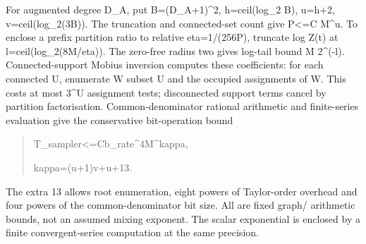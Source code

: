 \documentclass[
]{article}
\begin{document}
For augmented degree D\_A, put B=(D\_A+1)\^{}2, h=ceil(log\_2 B), u=h+2,
v\allowbreak{}=\allowbreak{}c\allowbreak{}e\allowbreak{}i\allowbreak{}l\allowbreak{}(\allowbreak{}l\allowbreak{}o\allowbreak{}g\allowbreak{}\_\allowbreak{}2\allowbreak{}(\allowbreak{}3\allowbreak{}B\allowbreak{})\allowbreak{})\allowbreak{}.
The truncation and connected-set count give P\textless=C M\^{}u. To
enclose a prefix partition ratio to relative eta=1/(256P), truncate log
Z(t) at
l\allowbreak{}=\allowbreak{}c\allowbreak{}e\allowbreak{}i\allowbreak{}l\allowbreak{}(\allowbreak{}l\allowbreak{}o\allowbreak{}g\allowbreak{}\_\allowbreak{}2\allowbreak{}(\allowbreak{}8\allowbreak{}M\allowbreak{}/\allowbreak{}e\allowbreak{}t\allowbreak{}a\allowbreak{})\allowbreak{})\allowbreak{}.
The zero-free radius two gives log-tail bound M 2\^{}(-l).
Connected-support Mobius inversion computes these coefficients: for each
connected U, enumerate W subset U and the occupied assignments of W.
This costs at most 3\^{}\textbar U\textbar{} assignment tests;
disconnected support terms cancel by partition factorisation.
Common-denominator rational arithmetic and finite-series evaluation give
the conservative bit-operation bound

\begin{quote}\small\ttfamily\raggedright\setlength{\parskip}{0pt}
\noindent T\allowbreak{}\_\allowbreak{}s\allowbreak{}a\allowbreak{}m\allowbreak{}p\allowbreak{}l\allowbreak{}e\allowbreak{}r\allowbreak{}<\allowbreak{}=\allowbreak{}C\allowbreak{}\hspace*{0.525em}\allowbreak{}b\allowbreak{}\_\allowbreak{}r\allowbreak{}a\allowbreak{}t\allowbreak{}e\allowbreak{}\^{}\allowbreak{}4\allowbreak{}\hspace*{0.525em}\allowbreak{}M\allowbreak{}\^{}\allowbreak{}k\allowbreak{}a\allowbreak{}p\allowbreak{}p\allowbreak{}a\allowbreak{},\par
\noindent k\allowbreak{}a\allowbreak{}p\allowbreak{}p\allowbreak{}a\allowbreak{}=\allowbreak{}(\allowbreak{}u\allowbreak{}+\allowbreak{}1\allowbreak{})\allowbreak{}v\allowbreak{}+\allowbreak{}u\allowbreak{}+\allowbreak{}1\allowbreak{}3\allowbreak{}.\par
\end{quote}

The extra 13 allows root enumeration, eight powers of Taylor-order
overhead and four powers of the common-denominator bit size. All are
fixed graph/ arithmetic bounds, not an assumed mixing exponent. The
scalar exponential is enclosed by a finite convergent-series computation
at the same precision.
\end{document}
